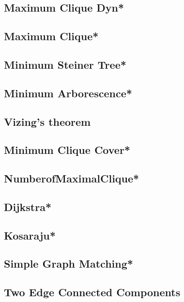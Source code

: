 \subsection{Maximum Clique Dyn*} %
 
\subsection{Maximum Clique*} %

\subsection{Minimum Steiner Tree*} %

\subsection{Minimum Arborescence*} %

\subsection{Vizing's theorem}

\subsection{Minimum Clique Cover*} %

\subsection{NumberofMaximalClique*} %

\subsection{Dijkstra*}

\subsection{Kosaraju*}

\subsection{Simple Graph Matching*}

\subsection{Two Edge Connected Components}

